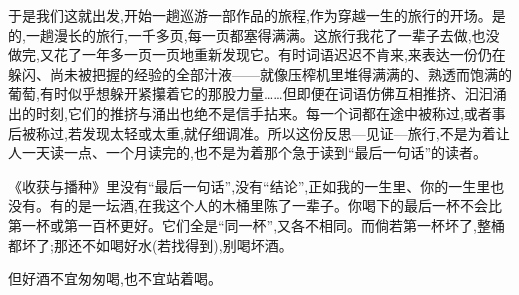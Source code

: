 于是我们这就出发,开始一趟巡游一部作品的旅程,作为穿越一生的旅行的开场。是的,一趟漫长的旅行,一千多页,每一页都塞得满满。这旅行我花了一辈子去做,也没做完,又花了一年多一页一页地重新发现它。有时词语迟迟不肯来,来表达一份仍在躲闪、尚未被把握的经验的全部汁液——就像压榨机里堆得满满的、熟透而饱满的葡萄,有时似乎想躲开紧攥着它的那股力量……但即便在词语仿佛互相推挤、汩汩涌出的时刻,它们的推挤与涌出也绝不是信手拈来。每一个词都在途中被称过,或者事后被称过,若发现太轻或太重,就仔细调准。所以这份反思—见证—旅行,不是为着让人一天读一点、一个月读完的,也不是为着那个急于读到“最后一句话”的读者。

《收获与播种》里没有“最后一句话”,没有“结论”,正如我的一生里、你的一生里也没有。有的是一坛酒,在我这个人的木桶里陈了一辈子。你喝下的最后一杯不会比第一杯或第一百杯更好。它们全是“同一杯”,又各不相同。而倘若第一杯坏了,整桶都坏了;那还不如喝好水(若找得到),别喝坏酒。

 但好酒不宜匆匆喝,也不宜站着喝。
